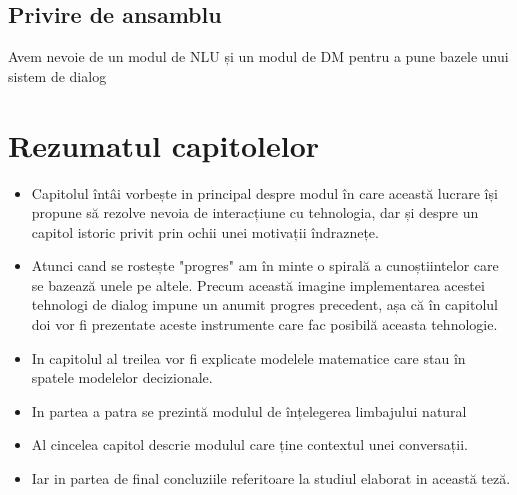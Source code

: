 \subsection{Privire de ansamblu}

Avem nevoie de un modul de NLU și un modul de DM pentru a pune bazele unui sistem de dialog

\section{Rezumatul capitolelor}

\begin{itemize}
	\item 
	Capitolul întâi vorbește in principal despre modul în care această lucrare își propune să rezolve nevoia de interacțiune cu tehnologia, dar și despre un capitol istoric privit prin ochii unei motivații îndraznețe.
	\item
	Atunci cand se rostește "progres" am în minte o  spirală a cunoștiintelor care se bazează unele pe altele. Precum această imagine implementarea acestei tehnologi de dialog impune un anumit progres precedent, așa că în capitolul doi vor fi prezentate aceste instrumente care fac posibilă aceasta tehnologie.
	\item
	In capitolul al treilea vor fi explicate modelele matematice care stau în spatele modelelor decizionale.
	\item
	In partea a patra se prezintă modulul de înțelegerea limbajului natural
	\item
	Al cincelea capitol descrie modulul care ține contextul unei conversații.
	\item
	Iar in partea de final concluziile referitoare la studiul elaborat in această teză.
\end{itemize}

